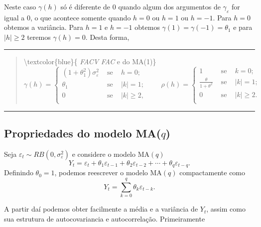 \documentclass[
]{book}
\theoremstyle{definition}
\theoremstyle{definition}
\theoremstyle{definition}
\theoremstyle{remark}
\begin{document}
Neste caso \(\gamma(h)\) só é diferente de 0 quando algum dos argumentos de \(\gamma_\varepsilon\) for igual a 0, o que acontece somente quando \(h=0\) ou \(h=1\) ou \(h=-1\). Para \(h=0\) obtemos a variância. Para \(h=1\) e \(h=-1\) obtemos \(\gamma(1)=\gamma(-1)=\theta_1\) e para \(|h| \geq 2\) teremos \(\gamma(h) = 0\).
Desta forma,

\begin{center}\rule{0.5\linewidth}{0.5pt}\end{center}

\begin{quote}
\textbackslash textcolor\{blue\}\{ \emph{FACV} \emph{FAC} e do MA(1)\}
\[
\gamma(h)=\begin{cases}
(1+\theta_1^2)\sigma_\varepsilon^2 &\mbox{  se  }\,\,\,\,\,  h=0;\\
\theta_1&\mbox{  se  }\,\,\,\,\,  |k|=1;\\
0&\mbox{  se  }\,\,\,\,\,  |k|\geq 2,\\
\end{cases}\qquad
\rho(h)=\begin{cases}
1&\mbox{  se  }\,\,\,\,\,  k=0;\\
\frac{\theta}{1+\theta^2}&\mbox{  se  }\,\,\,\,\,  |k|=1;\\
0&\mbox{  se  }\,\,\,\,\,  |k|\geq 2.\\
\end{cases}
\]
\end{quote}

\begin{center}\rule{0.5\linewidth}{0.5pt}\end{center}

\hypertarget{propriedades-do-modelo-maq}{%
\subsection{\texorpdfstring{Propriedades do modelo MA(\(q\))}{Propriedades do modelo MA(q)}}\label{propriedades-do-modelo-maq}}

Seja \(\varepsilon_t\sim RB(0,\sigma_\varepsilon^2)\) e considere o modelo MA\((q)\)
\[ Y_t= \varepsilon_t + \theta_1 \varepsilon_{t-1} + \theta_2 \varepsilon_{t-2} +\cdots+ \theta_q \varepsilon_{t-q}.\]
Definindo \(\theta_0=1\), podemos reescrever o modelo MA\((q)\) compactamente como
\[ Y_t= \sum_{k=0}^q \theta_k\varepsilon_{t-k}.\]

A partir daí podemos obter facilmente a média e a variância de \(Y_t\), assim como sua estrutura de autocovariancia e autocorrelação. Primeiramente
\end{document}
